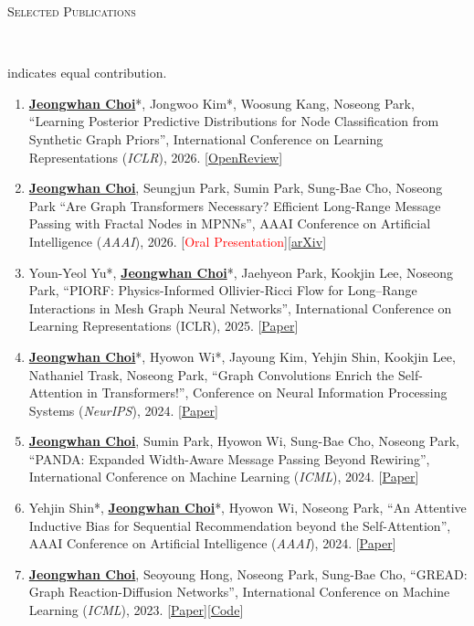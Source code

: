 \documentclass[10pt]{article}
\newenvironment{changemargin}[2]{
  \begin{list}{}{
    \setlength{\topsep}{0pt}
    \setlength{\leftmargin}{#1}
    \setlength{\rightmargin}{#2}
    \setlength{\listparindent}{\parindent}
    \setlength{\itemindent}{\parindent}
    \setlength{\parsep}{\parskip}
  }
  \item[]}{\end{list}
}
\newcommand{\lineover}{
	\begin{changemargin}{-0.05in}{-0.05in}
		\vspace*{-8pt}
		\hrulefill \\
		\vspace*{-2pt}
	\end{changemargin}
}
\newcommand{\header}[1]{
	\begin{changemargin}{-0.5in}{-0.5in}
		\scshape{#1}\\
  	\lineover
	\end{changemargin}
}
\newcommand{\RED}[1]{\textcolor{red}{#1}}
\newcommand{\textbu}[1]{\underline{\textbf{#1}}}
\newenvironment{body} {
	\vspace*{-16pt}
	\begin{changemargin}{-0.25in}{-0.5in}
  }
	{\end{changemargin}
}
\begin{document}
\header{Selected Publications}
\begin{body}
	\vspace{14pt}
{\small * indicates equal contribution.}
	\vspace{14pt}
\begin{enumerate}
    \item \textbu{Jeongwhan Choi}*, Jongwoo Kim*, Woosung Kang, Noseong Park, ``Learning Posterior Predictive Distributions for Node Classification from Synthetic Graph Priors'', International Conference on Learning Representations (\textit{ICLR}), 2026. [\href{https://openreview.net/forum?id=qkBBHixPow}{OpenReview}]
    \item \textbu{Jeongwhan Choi}, Seungjun Park, Sumin Park, Sung-Bae Cho, Noseong Park ``Are Graph Transformers Necessary? Efficient Long-Range Message Passing with Fractal Nodes in MPNNs'', AAAI Conference on Artificial Intelligence (\textit{AAAI}), 2026. [\RED{Oral Presentation}][\href{http://arxiv.org/abs/2511.13010}{arXiv}]
    \item Youn-Yeol Yu*, \textbu{Jeongwhan Choi}*, Jaehyeon Park, Kookjin Lee, Noseong Park, ``PIORF: Physics-Informed Ollivier-Ricci Flow for Long–Range Interactions in Mesh Graph Neural Networks'', International Conference on Learning Representations (ICLR), 2025. [\href{https://openreview.net/forum?id=qkBBHixPow}{Paper}]
    \item \textbu{Jeongwhan Choi}*, Hyowon Wi*, Jayoung Kim, Yehjin Shin, Kookjin Lee, Nathaniel Trask, Noseong Park, ``Graph Convolutions Enrich the Self-Attention in Transformers!'', Conference on Neural Information Processing Systems (\textit{NeurIPS}), 2024. [\href{https://proceedings.neurips.cc/paper_files/paper/2024/hash/5eceb48c3bc8b5d936c05ff8e2ece65e-Abstract-Conference.html}{Paper}]
    \item \textbu{Jeongwhan Choi}, Sumin Park, Hyowon Wi, Sung-Bae Cho, Noseong Park, ``PANDA: Expanded Width-Aware Message Passing Beyond Rewiring'', International Conference on Machine Learning (\textit{ICML}), 2024. [\href{https://proceedings.mlr.press/v235/choi24f.html}{Paper}]
    \item Yehjin Shin*, \textbu{Jeongwhan Choi}*, Hyowon Wi, Noseong Park, ``An Attentive Inductive Bias for Sequential Recommendation beyond the Self-Attention'', AAAI Conference on Artificial Intelligence (\textit{AAAI}), 2024. [\href{https://ojs.aaai.org/index.php/AAAI/article/view/28747}{Paper}]
    \item \textbu{Jeongwhan Choi}, Seoyoung Hong, Noseong Park, Sung-Bae Cho, ``GREAD: Graph Reaction-Diffusion Networks'', International Conference on Machine Learning (\textit{ICML}), 2023. [\href{http://proceedings.mlr.press/v202/choi23a}{Paper}][\href{https://github.com/jeongwhanchoi/GREAD}{Code}]

\end{enumerate}
\end{body}
\end{document}

